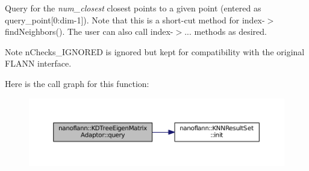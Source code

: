 Query for the {\itshape num\-\_\-closest} closest points to a given point (entered as query\-\_\-point\mbox{[}0\-:dim-\/1\mbox{]}). Note that this is a short-\/cut method for index-\/$>$find\-Neighbors(). The user can also call index-\/$>$... methods as desired. \begin{DoxyNote}{Note}
n\-Checks\-\_\-\-I\-G\-N\-O\-R\-E\-D is ignored but kept for compatibility with the original F\-L\-A\-N\-N interface. 
\end{DoxyNote}


Here is the call graph for this function\-:
\nopagebreak
\begin{figure}[H]
\begin{center}
\leavevmode
\includegraphics[width=350pt]{structnanoflann_1_1_k_d_tree_eigen_matrix_adaptor_a65ad5a444a16a474351e39b7775accaa_cgraph}
\end{center}
\end{figure}




